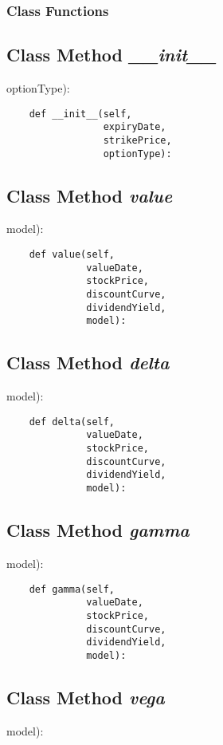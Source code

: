 \documentclass[twoside,11pt]{book}
\begin{document}
\subsubsection{Class Functions}

\subsection{Class Method {\it \_\_init\_\_}}
optionType):

\begin{lstlisting}
    def __init__(self,
                 expiryDate,
                 strikePrice,
                 optionType):
\end{lstlisting}

\subsection{Class Method {\it value}}
model):

\begin{lstlisting}
    def value(self,
              valueDate,
              stockPrice,
              discountCurve,
              dividendYield,
              model):
\end{lstlisting}

\subsection{Class Method {\it delta}}
model):

\begin{lstlisting}
    def delta(self,
              valueDate,
              stockPrice,
              discountCurve,
              dividendYield,
              model):
\end{lstlisting}

\subsection{Class Method {\it gamma}}
model):

\begin{lstlisting}
    def gamma(self,
              valueDate,
              stockPrice,
              discountCurve,
              dividendYield,
              model):
\end{lstlisting}

\subsection{Class Method {\it vega}}
model):
\end{document}
